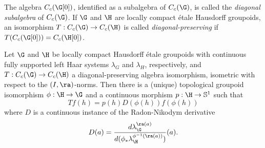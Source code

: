 \begin{definition}
The algebra $C_c(\G[0])$, identified as a subalgebra of $C_c(\G)$, is called the \emph{diagonal subalgebra} of $C_c(\G)$. If $\G$ and $\H$ are locally compact étale Hausdorff groupoids, an isomorphism $T: C_c(\G)\to C_c(\H)$ is called \emph{diagonal-preserving} if $T(C_c(\G[0]))=C_c(\H[0])$.
\end{definition}

\begin{theorem}\label{theoremrenault}
Let $\G$ and $\H$ be locally compact Hausdorff étale groupoids with continuous fully supported left Haar systems $\lambda_G$ and $\lambda_H$, respectively, and $T:C_c(\G)\to C_c(\H)$ a diagonal-preserving algebra isomorphism, isometric with respect to the $(I,\ra)$-norms. Then there is a (unique) topological groupoid isomorphism $\phi:\H\to\G$ and a continuous morphism $p:\H\to\mathbb{S}^1$ such that
\[Tf(h)=p(h)D(\phi(h))f(\phi(h))\]
where $D$ is a continuous instance of the Radon-Nikodym derivative
\[D(a)=\frac{d\lambda_{\G}^{\ra(a)}}{d(\phi_*\lambda_{\H}^{\phi^{-1}(\ra(a))})}(a).\]
\end{theorem}
